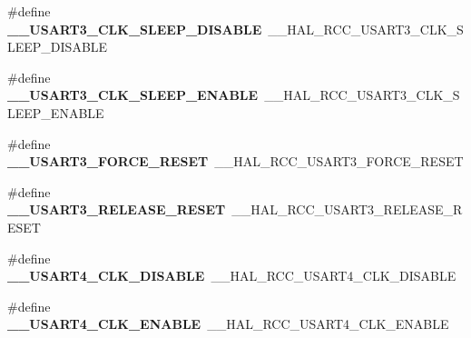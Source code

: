 \begin{DoxyCompactItemize}
\item 
\hypertarget{group___h_a_l___r_c_c___aliased_ga32b28245d8d5a75b7182779315cb74d8}{\#define {\bfseries \-\_\-\-\_\-\-U\-S\-A\-R\-T3\-\_\-\-C\-L\-K\-\_\-\-S\-L\-E\-E\-P\-\_\-\-D\-I\-S\-A\-B\-L\-E}~\-\_\-\-\_\-\-H\-A\-L\-\_\-\-R\-C\-C\-\_\-\-U\-S\-A\-R\-T3\-\_\-\-C\-L\-K\-\_\-\-S\-L\-E\-E\-P\-\_\-\-D\-I\-S\-A\-B\-L\-E}\label{group___h_a_l___r_c_c___aliased_ga32b28245d8d5a75b7182779315cb74d8}

\item 
\hypertarget{group___h_a_l___r_c_c___aliased_gad2b6888f9a8ef85b727f7eabf6501d2f}{\#define {\bfseries \-\_\-\-\_\-\-U\-S\-A\-R\-T3\-\_\-\-C\-L\-K\-\_\-\-S\-L\-E\-E\-P\-\_\-\-E\-N\-A\-B\-L\-E}~\-\_\-\-\_\-\-H\-A\-L\-\_\-\-R\-C\-C\-\_\-\-U\-S\-A\-R\-T3\-\_\-\-C\-L\-K\-\_\-\-S\-L\-E\-E\-P\-\_\-\-E\-N\-A\-B\-L\-E}\label{group___h_a_l___r_c_c___aliased_gad2b6888f9a8ef85b727f7eabf6501d2f}

\item 
\hypertarget{group___h_a_l___r_c_c___aliased_ga4f128e1456098323bd12668d7c934522}{\#define {\bfseries \-\_\-\-\_\-\-U\-S\-A\-R\-T3\-\_\-\-F\-O\-R\-C\-E\-\_\-\-R\-E\-S\-E\-T}~\-\_\-\-\_\-\-H\-A\-L\-\_\-\-R\-C\-C\-\_\-\-U\-S\-A\-R\-T3\-\_\-\-F\-O\-R\-C\-E\-\_\-\-R\-E\-S\-E\-T}\label{group___h_a_l___r_c_c___aliased_ga4f128e1456098323bd12668d7c934522}

\item 
\hypertarget{group___h_a_l___r_c_c___aliased_gaab6dbb36cc19bb8ec325c5236fa8effe}{\#define {\bfseries \-\_\-\-\_\-\-U\-S\-A\-R\-T3\-\_\-\-R\-E\-L\-E\-A\-S\-E\-\_\-\-R\-E\-S\-E\-T}~\-\_\-\-\_\-\-H\-A\-L\-\_\-\-R\-C\-C\-\_\-\-U\-S\-A\-R\-T3\-\_\-\-R\-E\-L\-E\-A\-S\-E\-\_\-\-R\-E\-S\-E\-T}\label{group___h_a_l___r_c_c___aliased_gaab6dbb36cc19bb8ec325c5236fa8effe}

\item 
\hypertarget{group___h_a_l___r_c_c___aliased_gac6106654699e6d24b5d4c59830b55923}{\#define {\bfseries \-\_\-\-\_\-\-U\-S\-A\-R\-T4\-\_\-\-C\-L\-K\-\_\-\-D\-I\-S\-A\-B\-L\-E}~\-\_\-\-\_\-\-H\-A\-L\-\_\-\-R\-C\-C\-\_\-\-U\-S\-A\-R\-T4\-\_\-\-C\-L\-K\-\_\-\-D\-I\-S\-A\-B\-L\-E}\label{group___h_a_l___r_c_c___aliased_gac6106654699e6d24b5d4c59830b55923}

\item 
\hypertarget{group___h_a_l___r_c_c___aliased_gaf3e74387a8d428bfc2251ce0b4ca795c}{\#define {\bfseries \-\_\-\-\_\-\-U\-S\-A\-R\-T4\-\_\-\-C\-L\-K\-\_\-\-E\-N\-A\-B\-L\-E}~\-\_\-\-\_\-\-H\-A\-L\-\_\-\-R\-C\-C\-\_\-\-U\-S\-A\-R\-T4\-\_\-\-C\-L\-K\-\_\-\-E\-N\-A\-B\-L\-E}\label{group___h_a_l___r_c_c___aliased_gaf3e74387a8d428bfc2251ce0b4ca795c}


\end{DoxyCompactItemize}
